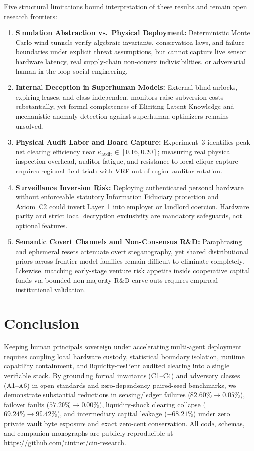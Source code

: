 \documentclass[11pt]{article}
\begin{document}
Five structural limitations bound interpretation of these results and remain open research frontiers:
\begin{enumerate}
  \item \textbf{Simulation Abstraction vs.\ Physical Deployment:} Deterministic Monte Carlo wind tunnels verify algebraic invariants, conservation laws, and failure boundaries under explicit threat assumptions, but cannot capture live sensor hardware latency, real supply-chain non-convex indivisibilities, or adversarial human-in-the-loop social engineering.
  \item \textbf{Internal Deception in Superhuman Models:} External blind airlocks, expiring leases, and class-independent monitors raise subversion costs substantially, yet formal completeness of Eliciting Latent Knowledge \citep{christiano2021elk} and mechanistic anomaly detection against superhuman optimizers remains unsolved.
  \item \textbf{Physical Audit Labor and Board Capture:} Experiment~3 identifies peak net clearing efficiency near $\kappa_{\mathrm{audit}} \in [0.16, 0.20]$; measuring real physical inspection overhead, auditor fatigue, and resistance to local clique capture requires regional field trials with VRF out-of-region auditor rotation.
  \item \textbf{Surveillance Inversion Risk:} Deploying authenticated personal hardware without enforceable statutory Information Fiduciary protection and Axiom~C2 could invert Layer~1 into employer or landlord coercion. Hardware parity and strict local decryption exclusivity are mandatory safeguards, not optional features.
  \item \textbf{Semantic Covert Channels and Non-Consensus R\&D:} Paraphrasing and ephemeral resets attenuate overt steganography, yet shared distributional priors across frontier model families remain difficult to eliminate completely. Likewise, matching early-stage venture risk appetite inside cooperative capital funds via bounded non-majority R\&D carve-outs requires empirical institutional validation.
\end{enumerate}

\section{Conclusion}\label{sec:conclusion}

Keeping human principals sovereign under accelerating multi-agent deployment requires coupling local hardware custody, statistical boundary isolation, runtime capability containment, and liquidity-resilient audited clearing into a single verifiable stack. By grounding formal invariants (C1--C4) and adversary classes (A1--A6) in open standards and zero-dependency paired-seed benchmarks, we demonstrate substantial reductions in sensing/ledger failures ($82.60\% \to 0.05\%$), failover faults ($57.20\% \to 0.00\%$), liquidity-shock clearing collapse ($69.24\% \to 99.42\%$), and intermediary capital leakage ($-68.21\%$) under zero private vault byte exposure and exact zero-cent conservation. All code, schemas, and companion monographs are publicly reproducible at \url{https://github.com/cintnet/cin-research}.

\FloatBarrier


\end{document}
